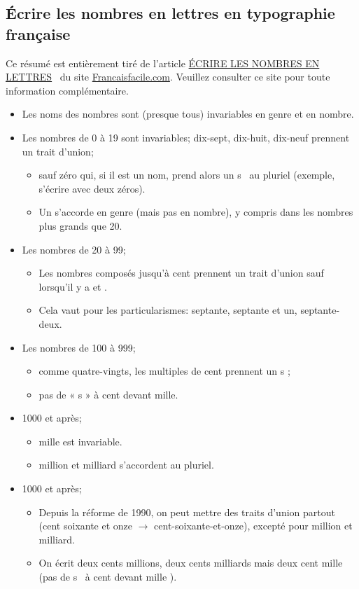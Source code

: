 \documentclass[a4paper,10pt]{article}
\begin{document}
\subsection{\'{E}crire les nombres en lettres en typographie française}%
\label{sub:ecrire_nombres_en_lettres}
Ce résumé est entièrement tiré de l'article \og \href{https://www.francaisfacile.com/exercices/exercice-francais-2/exercice-francais-53446.php}{ÉCRIRE LES NOMBRES EN LETTRES} \fg\ du site \href{https://www.francaisfacile.com/}{Francaisfacile.com}. Veuillez consulter ce site pour toute information complémentaire.

\begin{itemize}
    \item Les noms des nombres sont (presque tous) invariables en genre et en nombre.
    \item Les nombres de 0 à 19 sont invariables; dix-sept, dix-huit, dix-neuf prennent un trait d’union;
    \begin{itemize}
        \item sauf zéro qui, si il est un nom, prend alors un \og s \fg\ au pluriel (exemple, s'écrire avec deux zéros). 
        \item Un s'accorde en genre (mais pas en nombre), y compris dans les nombres plus grands que 20.
    \end{itemize}
    \item Les nombres de 20 à 99;
    \begin{itemize}
        \item Les nombres composés jusqu'à cent prennent un trait d'union sauf lorsqu'il y a \og et \fg.
        \item Cela vaut pour les particularismes: septante, septante et un, septante-deux.
    \end{itemize}
    \item Les nombres de 100 à 999;
    \begin{itemize}
        \item comme quatre-vingts, les multiples de cent prennent un \og s \fg;
        \item pas de « s » à cent devant mille.
    \end{itemize}
    \item 1000 et après;
    \begin{itemize}
        \item mille est invariable.
        \item million et milliard s'accordent au pluriel.
    \end{itemize}
    \item 1000 et après;
    \begin{itemize}
        \item Depuis la réforme de 1990, on peut mettre des traits d'union partout (cent soixante et onze $ \rightarrow $ cent-soixante-et-onze), excepté pour million et milliard.
        \item On écrit deux cents millions, deux cents milliards mais deux cent mille (pas de \og s \fg\ à \og cent devant mille \fg).
    \end{itemize}
\end{itemize}
\end{document}
